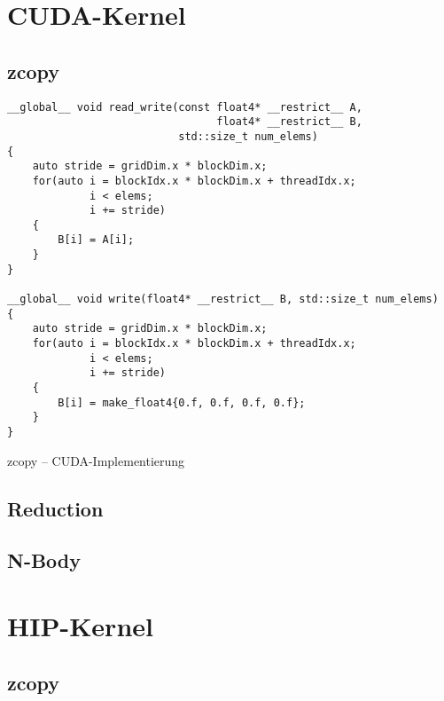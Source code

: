 \appendix

\section{CUDA-Kernel}

\subsection{zcopy}

\begin{code}
    \begin{verbatim}
__global__ void read_write(const float4* __restrict__ A,
                                 float4* __restrict__ B,
                           std::size_t num_elems)
{
    auto stride = gridDim.x * blockDim.x;
    for(auto i = blockIdx.x * blockDim.x + threadIdx.x;
             i < elems;
             i += stride)
    {
        B[i] = A[i];
    }
}

__global__ void write(float4* __restrict__ B, std::size_t num_elems)
{
    auto stride = gridDim.x * blockDim.x;
    for(auto i = blockIdx.x * blockDim.x + threadIdx.x;
             i < elems;
             i += stride)
    {
        B[i] = make_float4{0.f, 0.f, 0.f, 0.f};
    }
}
    \end{verbatim}
    \caption{zcopy -- CUDA-Implementierung}
    \label{anhang:cuda:zcopy}
\end{code}

\subsection{Reduction}
\label{anhang:cuda:reduction}

\subsection{N-Body}

\section{HIP-Kernel}

\subsection{zcopy}

